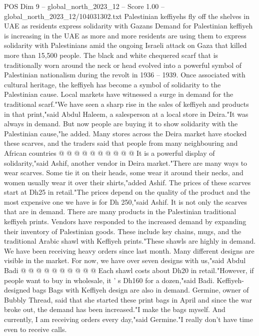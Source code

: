 \begin{textsample}{POS Dim 9 – global\_north\_2023\_12 – Score 1.00 – global\_north\_2023\_12/104031302.txt}  \label{ex:f9_pos_373}
Palestinian keffiyehs fly off the shelves in UAE as residents express solidarity with Gazans Demand for Palestinian keffiyeh is increasing in the UAE as more and more residents are using them to express solidarity with Palestinians amid the ongoing Israeli attack on Gaza that killed more than 15,500 people.
The black and white chequered scarf that is traditionally worn around the neck or head evolved into a powerful symbol of Palestinian nationalism during the revolt in 1936 -- 1939.
Once associated with cultural heritage, the keffiyeh has become a symbol of solidarity to the Palestinian cause.
Local markets have witnessed a surge in demand for the traditional scarf."We have seen a sharp rise in the sales of keffiyeh and products in that print,"said Abdul Haleem, a salesperson at a local store in Deira."It was always in demand.
But now people are buying it to show solidarity with the Palestinian cause,"he added.
Many stores across the Deira market have stocked these scarves, and the traders said that people from many neighbouring and African countries @ @ @ @ @ @ @ @ @ @ It is a powerful display of solidarity,"said Ashif, another vendor in Deira market."There are many ways to wear scarves.
Some tie it on their heads, some wear it around their necks, and women usually wear it over their shirts,"added Ashif.
The prices of these scarves start at Dh25 in retail."The prices depend on the quality of the product and the most expensive one we have is for Dh 250,"said Ashif.
It is not only the scarves that are in demand.
There are many products in the Palestinian traditional keffiyeh prints.
Vendors have responded to the increased demand by expanding their inventory of Palestinian goods.
These include key chains, mugs, and the traditional Arabic shawl with Keffiyeh prints."These shawls are highly in demand.
We have been receiving heavy orders since last month.
Many different designs are visible in the market.
For now, we have over seven designs with us,"said Abdul Badi @ @ @ @ @ @ @ @ @ @ Each shawl costs about Dh20 in retail."However, if people want to buy in wholesale, it ' s Dh160 for a dozen,"said Badi.
Keffiyeh-designed bags Bags with Keffiyeh design are also in demand.
Germine, owner of Bubbly Thread, said that she started these print bags in April and since the war broke out, the demand has been increased."I make the bags myself.
And currently, I am receiving orders every day,"said Germine."I really don't have time even to receive calls.

\end{textsample}
